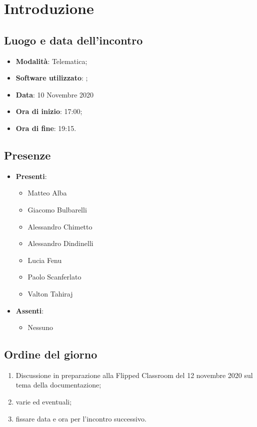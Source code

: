\documentclass[]{article}
\begin{document}
	
	
	
	\newpage
	
	\section{Introduzione}
		\subsection{Luogo e data dell'incontro}
		\begin{itemize}
			\item \textbf{Modalità}: Telematica;
			\item \textbf{Software utilizzato}: ;
			\item \textbf{Data}: 10 Novembre 2020
			\item \textbf{Ora di inizio}: 17:00;
			\item \textbf{Ora di fine}: 19:15.
		\end{itemize}
		
		\subsection{Presenze}
		\begin{itemize}
			\item \textbf{Presenti}: 
			\begin{itemize}
				\item Matteo Alba
				\item Giacomo Bulbarelli
				\item Alessandro Chimetto
				\item Alessandro Dindinelli
				\item Lucia Fenu
				\item Paolo Scanferlato
				\item Valton Tahiraj
			\end{itemize}
			\item \textbf{Assenti}:
			\begin{itemize}
				\item Nessuno
			\end{itemize}
		\end{itemize}
		
		\subsection{Ordine del giorno}
		\begin{enumerate}
			\item Discussione in preparazione alla Flipped Classroom del 12 novembre 2020 sul tema della documentazione;
			\item varie ed eventuali;
			\item fissare data e ora per l'incontro successivo.
		\end{enumerate}
\end{document}
